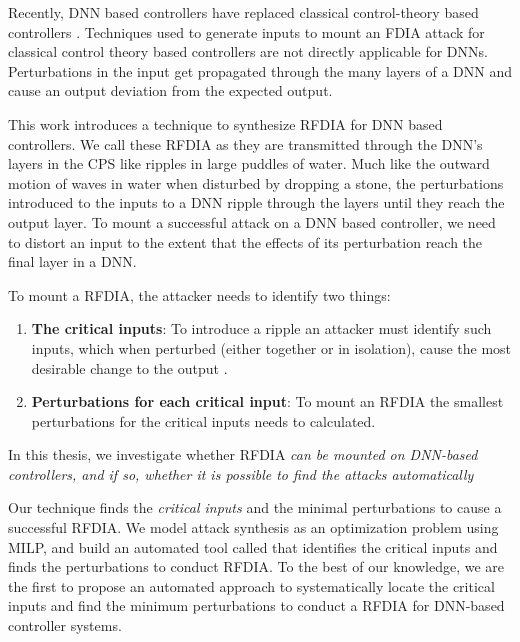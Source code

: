 Recently,  \ac{DNN} based controllers have replaced classical control-theory based controllers \cite{xiang18} \cite{Kocic2019} \cite{bechtel2017deeppicar}.  
Techniques used to generate inputs to mount an FDIA attack for classical control theory based controllers are not directly applicable for DNNs. 
Perturbations in the input get propagated through the many layers of a DNN  and cause an output deviation from the expected output. 
 
This work introduces a technique to synthesize \ac{RFDIA} for DNN based controllers. 
We call these \ac{RFDIA} as they are transmitted through the DNN's layers in the CPS like ripples in large puddles of water. 
Much like the outward motion of waves in water when disturbed by dropping a stone, the perturbations introduced to the inputs to a DNN ripple through the layers until they reach the output layer. 
To mount a successful attack on a DNN based controller, we need to distort an input to the extent that the effects of its perturbation reach the final layer in a DNN. 

To mount a \ac{RFDIA}, the attacker needs to identify two things: 
\begin{enumerate}
	\item \textbf{The critical inputs}: To introduce a ripple an attacker must identify such inputs, which when perturbed (either together or in isolation), cause the most desirable change to the output .
	\item \textbf{Perturbations for each critical input}: To mount an \ac{RFDIA} the smallest perturbations for the critical inputs needs to calculated.    
\end{enumerate}


In this thesis, we investigate whether { \ac{RFDIA} \em can be mounted on DNN-based controllers, and if so, whether it is possible to find the attacks automatically}
                                                   
Our technique finds the \textit{critical inputs} and the minimal perturbations to cause a successful \ac{RFDIA}. We model attack synthesis as an optimization problem using \ac{MILP}, and build an automated tool called \tool that identifies the critical inputs and finds the perturbations to conduct \ac{RFDIA}. 
To the best of our knowledge, we are the first to  propose an automated approach to systematically locate the critical inputs and find the minimum perturbations to conduct a \ac{RFDIA} for DNN-based controller systems.

